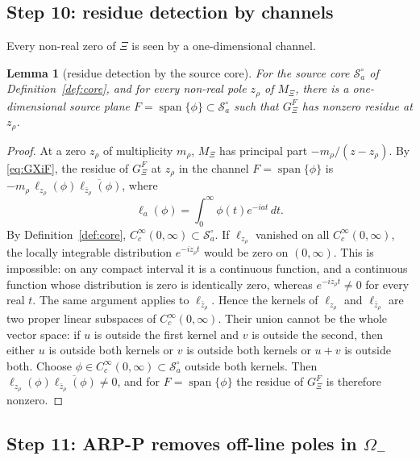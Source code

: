 \documentclass[11pt]{amsart}
\newtheorem{lemma}[theorem]{Lemma}
\theoremstyle{definition}
\theoremstyle{remark}
\theoremstyle{definition}
\newcommand{\cS}{\mathcal{S}}
\newcommand{\GXi}{G_\Xi}
\begin{document}
\subsection{Step 10: residue detection by channels}

Every non-real zero of $\Xi$ is seen by a one-dimensional channel.

\begin{lemma}[residue detection by the source core]\label{lem:residue}
For the source core $\cS_a^\circ$ of Definition~\ref{def:core}, and for every non-real pole $z_\rho$ of
$M_\Xi$, there is a one-dimensional source plane
$F=\operatorname{span}\{\phi\}\subset\cS_a^\circ$ such that $\GXi^F$ has nonzero residue at $z_\rho$.
\end{lemma}

\begin{proof}
At a zero $z_\rho$ of multiplicity $m_\rho$, $M_\Xi$ has principal part
$-m_\rho/(z-z_\rho)$.  By \eqref{eq:GXiF}, the residue of $\GXi^F$ at $z_\rho$ in the channel
$F=\operatorname{span}\{\phi\}$ is $-m_\rho\,\ell_{z_\rho}(\phi)\overline{\ell_{\bar z_\rho}(\phi)}$,
where
\[
   \ell_a(\phi)=\int_0^\infty \phi(t)e^{-iat}\,dt.
\]
By Definition~\ref{def:core}, $C_c^\infty(0,\infty)\subset\cS_a^\circ$.  If $\ell_{z_\rho}$ vanished on
all $C_c^\infty(0,\infty)$, the locally integrable distribution $e^{-iz_\rho t}$ would be zero on
$(0,\infty)$.  This is impossible: on any compact interval it is a continuous function, and a continuous
function whose distribution is zero is identically zero, whereas $e^{-iz_\rho t}\ne0$ for every real
$t$.  The same argument applies to $\ell_{\bar z_\rho}$.  Hence the kernels of $\ell_{z_\rho}$ and
$\ell_{\bar z_\rho}$ are two proper linear subspaces of $C_c^\infty(0,\infty)$.  Their union cannot be the
whole vector space: if $u$ is outside the first kernel and $v$ is outside the second, then either $u$ is
outside both kernels or $v$ is outside both kernels or $u+v$ is outside both.  Choose
$\phi\in C_c^\infty(0,\infty)\subset\cS_a^\circ$ outside both kernels.  Then
$\ell_{z_\rho}(\phi)\overline{\ell_{\bar z_\rho}(\phi)}\ne0$, and for
$F=\operatorname{span}\{\phi\}$ the residue of $\GXi^F$ is therefore nonzero.
\end{proof}

\subsection{Step 11: ARP-P removes off-line poles in \texorpdfstring{$\Omega_-$}{Omega-}}
\end{document}
